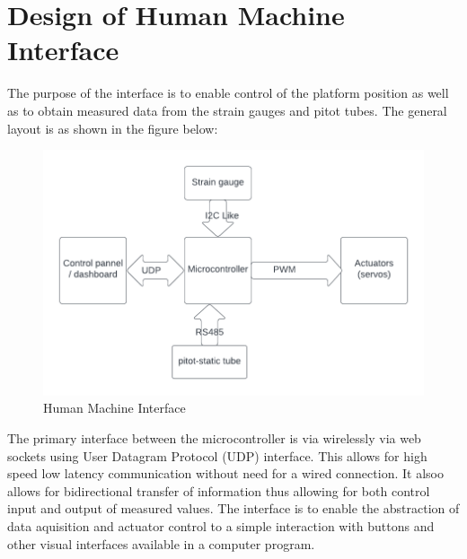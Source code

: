 \section{Design of Human Machine Interface}
The purpose of the interface is to enable control of the platform position as well as to obtain measured data from the strain gauges and pitot tubes. 
The general layout is as shown in the figure below:
\begin{center}
\begin{figure}
\centering
\includegraphics{Figures/Interface}
\caption[Human Machine Interface]{Human Machine Interface}
\end{figure}
\end{center}

The primary interface between the microcontroller is via wirelessly via web sockets using User Datagram Protocol (UDP) interface. This allows for high speed low latency communication without need for a wired connection. It alsoo allows for bidirectional transfer of information thus allowing for both control input and output of measured values. The interface is to enable the abstraction of data aquisition and actuator control to a simple interaction with buttons and other visual interfaces available in a computer program.

